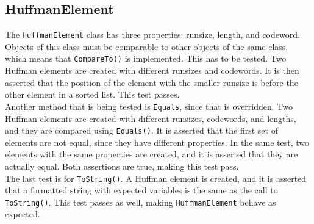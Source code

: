 \subsection{HuffmanElement}
The \lstinline|HuffmanElement| class has three properties: runsize, length, and codeword.
Objects of this class must be comparable to other objects of the same class, which means that \lstinline|CompareTo()| is implemented.
This has to be tested.
Two Huffman elements are created with different runsizes and codewords.
It is then asserted that the position of the element with the smaller runsize is before the other element in a sorted list.
This test passes.\\
Another method that is being tested is \lstinline|Equals|, since that is overridden.
Two Huffman elements are created with different runsizes, codewords, and lengths, and they are compared using \lstinline|Equals()|.
It is asserted that the first set of elements are not equal, since they have different properties.
In the same test, two elements with the same properties are created, and it is asserted that they are actually equal.
Both assertions are true, making this test pass.\\
The last test is for \lstinline|ToString()|.
A Huffman element is created, and it is asserted that a formatted string with expected variables is the same as the call to \lstinline|ToString()|.
This test passes as well, making \lstinline|HuffmanElement| behave as expected.

